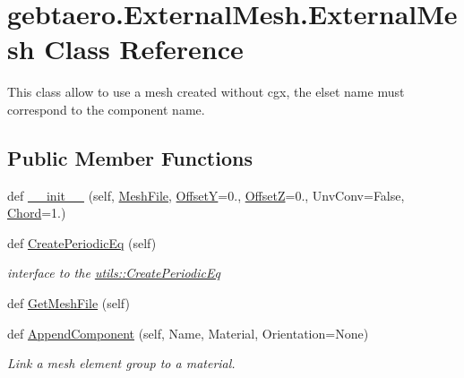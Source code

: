 \hypertarget{classgebtaero_1_1_external_mesh_1_1_external_mesh}{}\section{gebtaero.\+External\+Mesh.\+External\+Mesh Class Reference}
\label{classgebtaero_1_1_external_mesh_1_1_external_mesh}


This class allow to use a mesh created without cgx, the elset name must correspond to the component name.  


\subsection*{Public Member Functions}
\begin{DoxyCompactItemize}
\item 
def \hyperlink{classgebtaero_1_1_external_mesh_1_1_external_mesh_ad1301073ba0c00d8ad8fe3dc4baa6068}{\+\_\+\+\_\+init\+\_\+\+\_\+} (self, \hyperlink{classgebtaero_1_1_external_mesh_1_1_external_mesh_a53b38c75b026fb6c56b50b2dd9b5270f}{Mesh\+File}, \hyperlink{classgebtaero_1_1_external_mesh_1_1_external_mesh_a87faefe634a474727d516e58eb8bf944}{OffsetY}=0., \hyperlink{classgebtaero_1_1_external_mesh_1_1_external_mesh_a6639038ee73b225cf0d3ea1bd9c52783}{OffsetZ}=0., Unv\+Conv=False, \hyperlink{classgebtaero_1_1_external_mesh_1_1_external_mesh_ac9f8fc4f8dd8e81757bc8a5b2b5323d4}{Chord}=1.)
\item 
def \hyperlink{classgebtaero_1_1_external_mesh_1_1_external_mesh_aea59f570ee7b3c010c86c61384472834}{Create\+Periodic\+Eq} (self)
\begin{DoxyCompactList}\small\item\em interface to the \hyperlink{namespacegebtaero_1_1utils_a4f786ecbe66af9f64c802adf4e0a990f}{utils\+::\+Create\+Periodic\+Eq} \end{DoxyCompactList}\item 
def \hyperlink{classgebtaero_1_1_external_mesh_1_1_external_mesh_a9ac15ea158d9eeccf982355c551ae334}{Get\+Mesh\+File} (self)
\item 
def \hyperlink{classgebtaero_1_1_external_mesh_1_1_external_mesh_ad1c3ba8013a6829353d55d9513d49359}{Append\+Component} (self, Name, Material, Orientation=None)
\begin{DoxyCompactList}\small\item\em Link a mesh element group to a material. \end{DoxyCompactList}\item 

\end{DoxyCompactItemize}
